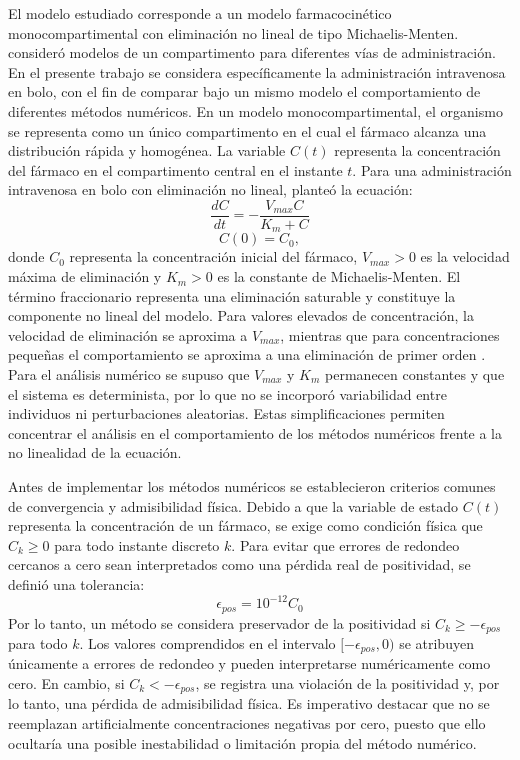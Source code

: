 \documentclass[11pt,final,5p,times,twocolumn,authoryear]{elsarticle}
\begin{document}
El modelo estudiado corresponde a un modelo farmacocinético monocompartimental con eliminación no lineal de tipo Michaelis-Menten. \citet{egbelowo2018} consideró modelos de un compartimento para diferentes vías de administración. En el presente trabajo se considera específicamente la administración intravenosa en bolo, con el fin de comparar bajo un mismo modelo el comportamiento de diferentes métodos numéricos. En un modelo monocompartimental, el organismo se representa como un único compartimento en el cual el fármaco alcanza una distribución rápida y homogénea. La variable $C(t)$ representa la concentración del fármaco en el compartimento central en el instante $t$. Para una administración intravenosa en bolo con eliminación no lineal, \citet{egbelowo2018} planteó la ecuación:
\begin{equation}
\frac{dC}{dt} = -\frac{V_{max}C}{K_m + C}
\end{equation}
\begin{equation}
C(0) = C_0,
\end{equation}
donde $C_0$ representa la concentración inicial del fármaco, $V_{max} > 0$ es la velocidad máxima de eliminación y $K_m > 0$ es la constante de Michaelis-Menten. El término fraccionario representa una eliminación saturable y constituye la componente no lineal del modelo. Para valores elevados de concentración, la velocidad de eliminación se aproxima a $V_{max}$, mientras que para concentraciones pequeñas el comportamiento se aproxima a una eliminación de primer orden \citep{tang2007}. Para el análisis numérico se supuso que $V_{max}$ y $K_m$ permanecen constantes y que el sistema es determinista, por lo que no se incorporó variabilidad entre individuos ni perturbaciones aleatorias. Estas simplificaciones permiten concentrar el análisis en el comportamiento de los métodos numéricos frente a la no linealidad de la ecuación. 

Antes de implementar los métodos numéricos se establecieron criterios comunes de convergencia y admisibilidad física. Debido a que la variable de estado $C(t)$ representa la concentración de un fármaco, se exige como condición física que $C_k \ge 0$ para todo instante discreto $k$. Para evitar que errores de redondeo cercanos a cero sean interpretados como una pérdida real de positividad, se definió una tolerancia:
\begin{equation}
\epsilon_{pos} = 10^{-12}C_0
\end{equation}
Por lo tanto, un método se considera preservador de la positividad si $C_k \ge -\epsilon_{pos}$ para todo $k$. Los valores comprendidos en el intervalo $[-\epsilon_{pos}, 0)$ se atribuyen únicamente a errores de redondeo y pueden interpretarse numéricamente como cero. En cambio, si $C_k < -\epsilon_{pos}$, se registra una violación de la positividad y, por lo tanto, una pérdida de admisibilidad física. Es imperativo destacar que no se reemplazan artificialmente concentraciones negativas por cero, puesto que ello ocultaría una posible inestabilidad o limitación propia del método numérico.
\end{document}
